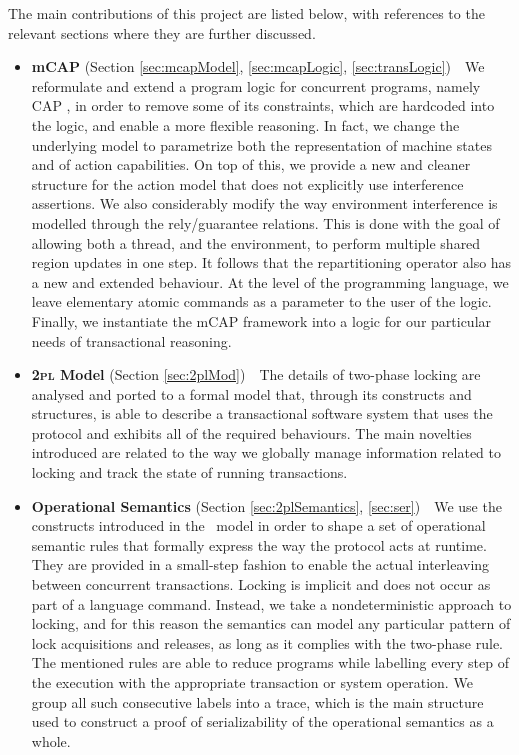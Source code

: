 The main contributions of this project are listed below, with references to the relevant sections where they are further discussed.
\begin{itemize}
	\item \textbf{mCAP} (Section \ref{sec:mcapModel}, \ref{sec:mcapLogic}, \ref{sec:transLogic})\ \ We reformulate and extend a program logic for concurrent programs, namely CAP \cite{cap}, in order to remove some of its constraints, which are hardcoded into the logic, and enable a more flexible reasoning. In fact, we change the underlying model to parametrize both the representation of machine states and of action capabilities. On top of this, we provide a new and cleaner structure for the action model that does not explicitly use interference assertions. We also considerably modify the way environment interference is modelled through the rely/guarantee relations. This is done with the goal of allowing both a thread, and the environment, to perform multiple shared region updates in one step. It follows that the repartitioning operator also has a new and extended behaviour. At the level of the programming language, we leave elementary atomic commands as a parameter to the user of the logic. Finally, we instantiate the mCAP framework into a logic for our particular needs of transactional reasoning.
	
	\item \textbf{\textsc{2pl} Model} (Section \ref{sec:2plMod})\ \ The details of two-phase locking are analysed and ported to a formal model that, through its constructs and structures, is able to describe a transactional software system that uses the protocol and exhibits all of the required behaviours. The main novelties introduced are related to the way we globally manage information related to locking and track the state of running transactions.
	
	\item \textbf{Operational Semantics} (Section \ref{sec:2plSemantics}, \ref{sec:ser})\ \ We use the constructs introduced in the \tpl\ model in order to shape a set of operational semantic rules that formally express the way the protocol acts at runtime. They are provided in a small-step fashion to enable the actual interleaving between concurrent transactions. Locking is implicit and does not occur as part of a language command. Instead, we take a nondeterministic approach to locking, and for this reason the semantics can model any particular pattern of lock acquisitions and releases, as long as it complies with the two-phase rule. The mentioned rules are able to reduce programs while labelling every step of the execution with the appropriate transaction or system operation. We group all such consecutive labels into a trace, which is the main structure used to construct a proof of serializability of the operational semantics as a whole. 
	

\end{itemize}
